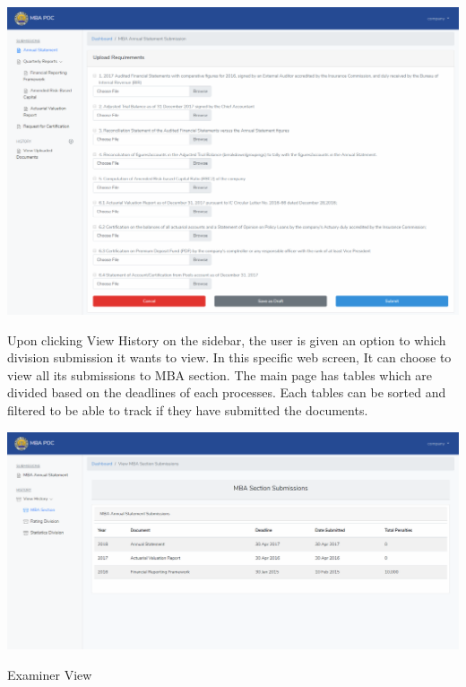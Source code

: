 \documentclass{article}
\begin{document}
\mdhr{}%

\noindent{}\includegraphics[keepaspectratio=true]{up-ic-screens/image206}{}%

Upon clicking View History on the sidebar, the user is
given an option to which division submission it wants to view. In this
specific web screen, It can choose to view all its submissions to MBA
section. The main page has tables which are divided based on the
deadlines of each processes. Each tables can be sorted and filtered to
be able to track if they have submitted the documents.%

\includegraphics[keepaspectratio=true]{up-ic-screens/image10}{}%

\mdhr{}%

\noindent{}Examiner View%
\end{document}
